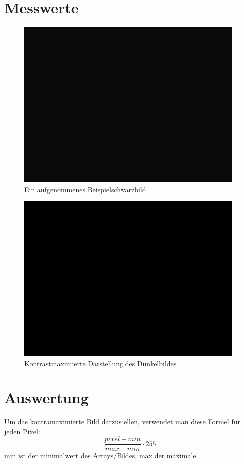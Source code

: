 \documentclass[12pt, oneside, a4paper, \docLanguage]{report}
\begin{document}
\section{Messwerte}
\label{chap:VERSUCH_2_MESSWERTE}
\begin{figure}[H]
	\centering\small
	\includegraphics[width=11cm]{bildschwarz1.png}
	\caption{Ein aufgenommenes Beispielschwarzbild}
\end{figure}
\begin{figure}[H]
	\centering\small
	\includegraphics[width=11cm]{kontrastmaxBlack.png}
	\caption{Kontrastmaximierte Darstellung des Dunkelbildes}
\end{figure}
\section{Auswertung}

\label{chap:VERSUCH_2_AUSWERTUNG}
Um das kontramaximierte Bild darzustellen, verwendet man diese Formel für jeden Pixel:
	$$\frac{pixel - min}{max-min}\cdot255$$
	min ist der minimalwert des Arrays/Bildes, max der maximale.
	
\end{document}
